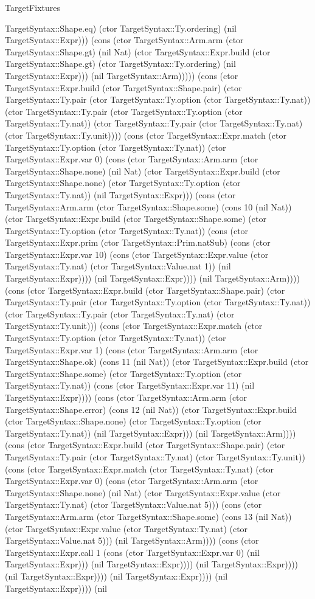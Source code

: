 \begin{lexlean}{TargetFixtures}
\begin{semanticmodule}
{TargetSyntax::Shape.eq) (ctor TargetSyntax::Ty.ordering) (nil TargetSyntax::Expr))) (cons (ctor TargetSyntax::Arm.arm (ctor TargetSyntax::Shape.gt) (nil Nat) (ctor TargetSyntax::Expr.build (ctor TargetSyntax::Shape.gt) (ctor TargetSyntax::Ty.ordering) (nil TargetSyntax::Expr))) (nil TargetSyntax::Arm))))) (cons (ctor TargetSyntax::Expr.build (ctor TargetSyntax::Shape.pair) (ctor TargetSyntax::Ty.pair (ctor TargetSyntax::Ty.option (ctor TargetSyntax::Ty.nat)) (ctor TargetSyntax::Ty.pair (ctor TargetSyntax::Ty.option (ctor TargetSyntax::Ty.nat)) (ctor TargetSyntax::Ty.pair (ctor TargetSyntax::Ty.nat) (ctor TargetSyntax::Ty.unit)))) (cons (ctor TargetSyntax::Expr.match (ctor TargetSyntax::Ty.option (ctor TargetSyntax::Ty.nat)) (ctor TargetSyntax::Expr.var 0) (cons (ctor TargetSyntax::Arm.arm (ctor TargetSyntax::Shape.none) (nil Nat) (ctor TargetSyntax::Expr.build (ctor TargetSyntax::Shape.none) (ctor TargetSyntax::Ty.option (ctor TargetSyntax::Ty.nat)) (nil TargetSyntax::Expr))) (cons (ctor TargetSyntax::Arm.arm (ctor TargetSyntax::Shape.some) (cons 10 (nil Nat)) (ctor TargetSyntax::Expr.build (ctor TargetSyntax::Shape.some) (ctor TargetSyntax::Ty.option (ctor TargetSyntax::Ty.nat)) (cons (ctor TargetSyntax::Expr.prim (ctor TargetSyntax::Prim.natSub) (cons (ctor TargetSyntax::Expr.var 10) (cons (ctor TargetSyntax::Expr.value (ctor TargetSyntax::Ty.nat) (ctor TargetSyntax::Value.nat 1)) (nil TargetSyntax::Expr)))) (nil TargetSyntax::Expr)))) (nil TargetSyntax::Arm)))) (cons (ctor TargetSyntax::Expr.build (ctor TargetSyntax::Shape.pair) (ctor TargetSyntax::Ty.pair (ctor TargetSyntax::Ty.option (ctor TargetSyntax::Ty.nat)) (ctor TargetSyntax::Ty.pair (ctor TargetSyntax::Ty.nat) (ctor TargetSyntax::Ty.unit))) (cons (ctor TargetSyntax::Expr.match (ctor TargetSyntax::Ty.option (ctor TargetSyntax::Ty.nat)) (ctor TargetSyntax::Expr.var 1) (cons (ctor TargetSyntax::Arm.arm (ctor TargetSyntax::Shape.ok) (cons 11 (nil Nat)) (ctor TargetSyntax::Expr.build (ctor TargetSyntax::Shape.some) (ctor TargetSyntax::Ty.option (ctor TargetSyntax::Ty.nat)) (cons (ctor TargetSyntax::Expr.var 11) (nil TargetSyntax::Expr)))) (cons (ctor TargetSyntax::Arm.arm (ctor TargetSyntax::Shape.error) (cons 12 (nil Nat)) (ctor TargetSyntax::Expr.build (ctor TargetSyntax::Shape.none) (ctor TargetSyntax::Ty.option (ctor TargetSyntax::Ty.nat)) (nil TargetSyntax::Expr))) (nil TargetSyntax::Arm)))) (cons (ctor TargetSyntax::Expr.build (ctor TargetSyntax::Shape.pair) (ctor TargetSyntax::Ty.pair (ctor TargetSyntax::Ty.nat) (ctor TargetSyntax::Ty.unit)) (cons (ctor TargetSyntax::Expr.match (ctor TargetSyntax::Ty.nat) (ctor TargetSyntax::Expr.var 0) (cons (ctor TargetSyntax::Arm.arm (ctor TargetSyntax::Shape.none) (nil Nat) (ctor TargetSyntax::Expr.value (ctor TargetSyntax::Ty.nat) (ctor TargetSyntax::Value.nat 5))) (cons (ctor TargetSyntax::Arm.arm (ctor TargetSyntax::Shape.some) (cons 13 (nil Nat)) (ctor TargetSyntax::Expr.value (ctor TargetSyntax::Ty.nat) (ctor TargetSyntax::Value.nat 5))) (nil TargetSyntax::Arm)))) (cons (ctor TargetSyntax::Expr.call 1 (cons (ctor TargetSyntax::Expr.var 0) (nil TargetSyntax::Expr))) (nil TargetSyntax::Expr)))) (nil TargetSyntax::Expr)))) (nil TargetSyntax::Expr)))) (nil TargetSyntax::Expr)))) (nil TargetSyntax::Expr)))) (nil }
\end{semanticmodule}
\end{lexlean}
